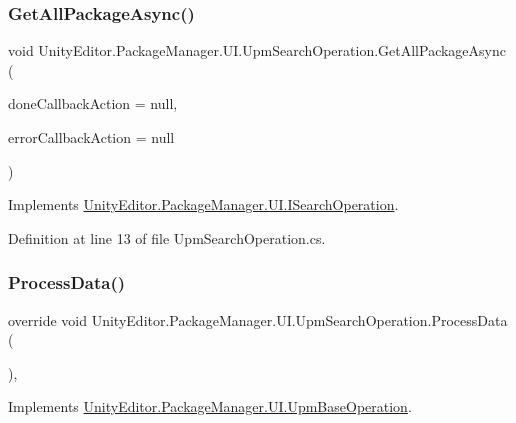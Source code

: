 \subsubsection{\texorpdfstring{GetAllPackageAsync()}{GetAllPackageAsync()}}
{\footnotesize\ttfamily void Unity\+Editor.\+Package\+Manager.\+U\+I.\+Upm\+Search\+Operation.\+Get\+All\+Package\+Async (\begin{DoxyParamCaption}\item[{Action$<$ I\+Enumerable$<$ \mbox{\hyperlink{class_unity_editor_1_1_package_manager_1_1_u_i_1_1_package_info}{Package\+Info}} $>$$>$}]{done\+Callback\+Action = {\ttfamily null},  }\item[{Action$<$ \mbox{\hyperlink{class_unity_editor_1_1_package_manager_1_1_u_i_1_1_upm_base_operation_a116dcc466d587905084e826b47f7e05b}{Error}} $>$}]{error\+Callback\+Action = {\ttfamily null} }\end{DoxyParamCaption})}



Implements \mbox{\hyperlink{interface_unity_editor_1_1_package_manager_1_1_u_i_1_1_i_search_operation_af96c1798a1e3b84d88c4da64dcb1f05d}{Unity\+Editor.\+Package\+Manager.\+U\+I.\+I\+Search\+Operation}}.



Definition at line 13 of file Upm\+Search\+Operation.\+cs.

\mbox{\label{class_unity_editor_1_1_package_manager_1_1_u_i_1_1_upm_search_operation_a1a7f1b1ca0ed96bcee79db2246cc3a4c}} 
\subsubsection{\texorpdfstring{ProcessData()}{ProcessData()}}
{\footnotesize\ttfamily override void Unity\+Editor.\+Package\+Manager.\+U\+I.\+Upm\+Search\+Operation.\+Process\+Data (\begin{DoxyParamCaption}{ }\end{DoxyParamCaption})\hspace{0.3cm}{\ttfamily [protected]}, {\ttfamily [virtual]}}



Implements \mbox{\hyperlink{class_unity_editor_1_1_package_manager_1_1_u_i_1_1_upm_base_operation_a5a4730e21b4cea1052e494cc5ca0eb84}{Unity\+Editor.\+Package\+Manager.\+U\+I.\+Upm\+Base\+Operation}}.



